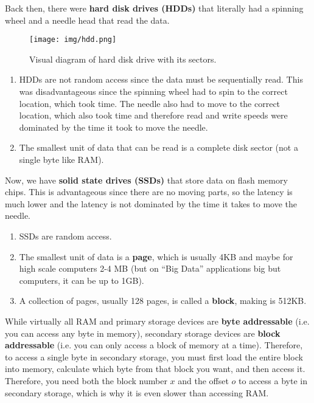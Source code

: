   \begin{definition}
    Back then, there were \textbf{hard disk drives (HDDs)} that literally had a spinning wheel and a needle head that read the data. 
    \begin{figure}[H]
      \centering 
      \texttt{[image: img/hdd.png]}
      \caption{Visual diagram of hard disk drive with its sectors. } 
      \label{fig:hdd}
    \end{figure}
    \begin{enumerate}
      \item HDDs are not random access since the data must be sequentially read. This was disadvantageous since the spinning wheel had to spin to the correct location, which took time. The needle also had to move to the correct location, which also took time and therefore read and write speeds were dominated by the time it took to move the needle.
      \item The smallest unit of data that can be read is a complete disk sector (not a single byte like RAM). 
    \end{enumerate}
  \end{definition}

  \begin{definition}
    Now, we have \textbf{solid state drives (SSDs)} that store data on flash memory chips. This is advantageous since there are no moving parts, so the latency is much lower and the latency is not dominated by the time it takes to move the needle. 
    \begin{enumerate}
      \item SSDs are random access. 
      \item The smallest unit of data is a \textbf{page}, which is usually 4KB and maybe for high scale computers 2-4 MB (but on ``Big Data'' applications big but computers, it can be up to 1GB). 
      \item A collection of pages, usually 128 pages, is called a \textbf{block}, making is 512KB. 
    \end{enumerate}
  \end{definition}

  While virtually all RAM and primary storage devices are \textbf{byte addressable} (i.e. you can access any byte in memory), secondary storage devices are \textbf{block addressable} (i.e. you can only access a block of memory at a time). Therefore, to access a single byte in secondary storage, you must first load the entire block into memory, calculate which byte from that block you want, and then access it. Therefore, you need both the block number $x$ and the offset $o$ to access a byte in secondary storage, which is why it is even slower than accessing RAM. 

